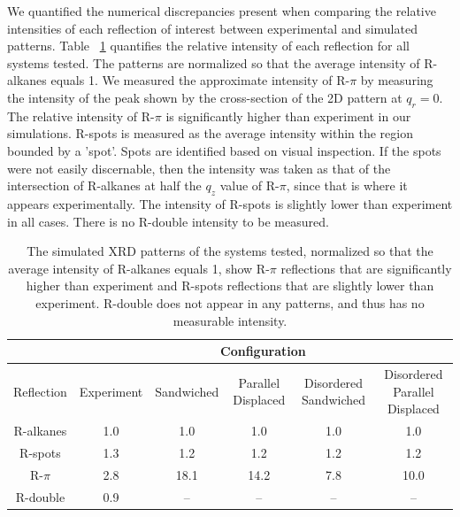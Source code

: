 \documentclass[journal=jpcbfk,manusciprt=article]{achemso}
\begin{document}
  We quantified the numerical discrepancies present when comparing the relative intensities
  of each reflection of interest between experimental and simulated patterns. Table 
  ~\ref{table:relative_inensities_300K} quantifies the relative intensity of each reflection for 
  all systems tested. The patterns are normalized so that the average intensity of R-alkanes 
  equals 1.
  We measured the approximate intensity of R-$\pi$ by measuring the intensity of the peak shown
  by the cross-section of the 2D pattern at $q_r=0$. The relative intensity of R-$\pi$ is 
  significantly higher than experiment in our simulations. R-spots is measured as the average
  intensity within the region bounded by a 'spot'. Spots are identified based on visual 
  inspection. If the spots were not easily discernable, then the intensity was taken as that of
  the intersection of R-alkanes at half the $q_z$ value of R-$\pi$, since that is where it 
  appears experimentally. The intensity of R-spots is slightly lower than experiment in all 
  cases. There is no R-double intensity to be measured.

  \begin{table}[h]
  \centering
  \begin{tabular}{cccccc}
  \toprule
 		   & \multicolumn{5}{c}{Configuration} \\
  \hline
  Reflection & Experiment & Sandwiched & Parallel Displaced & Disordered Sandwiched & Disordered Parallel Displaced \\
  \midrule
  R-alkanes & 1.0 &  1.0 &  1.0 & 1.0 & 1.0  \\  
  R-spots   & 1.3 &  1.2 &  1.2 & 1.2 & 1.2  \\
  R-$\pi$   & 2.8 & 18.1 & 14.2 & 7.8 & 10.0 \\
  R-double  & 0.9 &  --  & --   &  -- & --   \\ 
  \bottomrule
  \end{tabular}
  \caption{The simulated XRD patterns of the systems tested, normalized so that the average 
  intensity of R-alkanes equals 1, show R-$\pi$ reflections that are significantly higher 
  than experiment and R-spots reflections that are slightly lower than experiment. R-double
  does not appear in any patterns, and thus has no measurable intensity.}
  \label{table:relative_inensities_300K} 
  \end{table}
  
\end{document}
